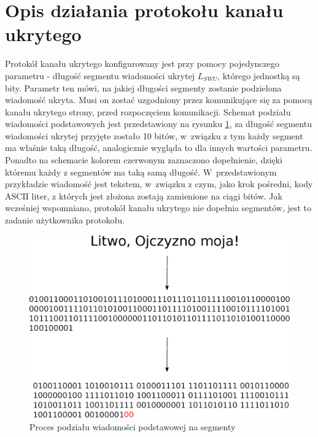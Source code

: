 \documentclass[a4paper, twoside, 12pt]{report}
\begin{document}
    \section{Opis działania protokołu kanału ukrytego}
    Protokół kanału ukrytego konfigurowany jest przy pomocy pojedynczego parametru -
    długość segmentu wiadomości ukrytej \( L_{SWU} \), którego jednostką są bity.
    Parametr ten mówi, na jakiej długości segmenty zostanie podzielona wiadomość
    ukryta. Musi on zostać uzgodniony przez komunikujące się za pomocą kanału
    ukrytego strony, przed rozpoczęciem komunikacji. Schemat podziału wiadomości
    podstawowych jest przedstawiony na rysunku \ref{SEGMENTATION}, za długość
    segmentu wiadomości ukrytej przyjęte zostało 10 bitów, w~związku z tym każdy segment
    ma właśnie taką długość, analogicznie wygląda to dla innych wartości parametru.
    Ponadto na schemacie kolorem czerwonym zaznaczono dopełnienie, dzięki któremu
    każdy z segmentów ma taką samą długość. W~przedstawionym przykładzie wiadomość
    jest tekstem, w~związku z czym, jako krok pośredni, kody ASCII liter, z których
    jest złożona zostają zamienione na ciągi bitów. Jak wcześniej wspomniano, protokół
    kanału ukrytego nie dopełnia segmentów, jest to zadanie użytkownika protokołu.
        \begin{figure}[h]
                \centering
                \includegraphics[scale=0.8]{podzial_na_segmenty}
                \caption{Proces podziału wiadomości podstawowej na segmenty}
                \label{SEGMENTATION}
        \end{figure}
\end{document}
